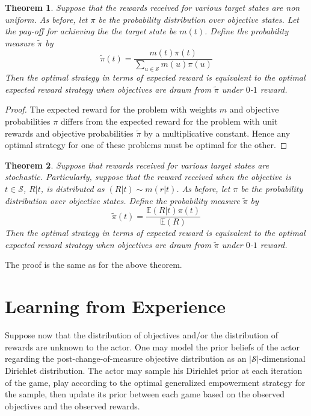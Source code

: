 \documentclass{article}
\newtheorem{theorem}{Theorem}
\newcommand{\EE}{\mathbb{E}}
\newcommand{\Ss}{\mathcal{S}}
\begin{document}
\begin{theorem}
Suppose that the rewards received for various target states are non uniform. As before, let $\pi$ be the probability distribution over objective states. 
Let the pay-off for achieving the the target state be $m(t)$. 
Define the probability measure $\tilde{\pi}$ by
\[\tilde{\pi}(t)=\frac{m(t)\pi(t)}{\sum_{u\in\Ss} m(u)\pi(u)}\] 
Then the optimal strategy in terms of expected reward is equivalent to the optimal expected reward strategy when objectives are drawn from $\tilde{\pi}$ under $0$-$1$ reward.
\end{theorem}
\begin{proof}
The expected reward for the problem with weights $m$ and objective probabilities $\pi$ differs from the expected reward for the problem with unit rewards and objective probabilities $\tilde{\pi}$ by a multiplicative constant. Hence any optimal strategy for one of these problems must be optimal for the other. 
\end{proof}
\begin{theorem} 
Suppose that rewards received for various target states are stochastic. Particularly, suppose that the reward received when the objective is $t\in\Ss$, $R|t$, is distributed as $(R|t)\sim m(r|t)$. As before, let $\pi$ be the probability distribution over objective states. Define the probability measure $\tilde{\pi}$ by
\[\tilde{\pi}(t)=\frac{\EE(R|t)\pi(t)}{\EE(R)}\] 
Then the optimal strategy in terms of expected reward is equivalent to the optimal expected reward strategy when objectives are drawn from $\tilde{\pi}$ under $0$-$1$ reward.
\end{theorem}
The proof is the same as for the above theorem.



\section{Learning from Experience}
Suppose now that the distribution of objectives and/or the distribution of rewards are unknown to the actor. 
One may model the prior beliefs of the actor regarding the post-change-of-measure objective distribution as an $|\Ss|$-dimensional Dirichlet distribution. 
The actor may sample his Dirichlet prior at each iteration of the game, play according to the optimal generalized empowerment strategy for the sample, then update its prior between each game based on the observed objectives and the observed rewards.


\newpage


\end{document}
